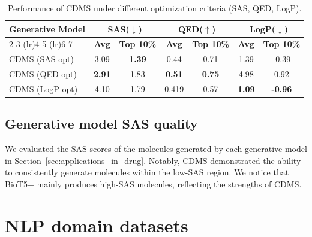 \documentclass[10pt]{article} %
\begin{document}
    \begin{table}[H]
        \centering
        \small %
        \begin{tabular}{l|c|c|c|c|c|c}
            \toprule
            \multirow{3}{*}{\parbox{1.5cm}{\centering \textbf{Generative Model}}} & \multicolumn{2}{c|}{\textbf{SAS($\downarrow$)}} & \multicolumn{2}{c|}{\textbf{QED($\uparrow$)}} & \multicolumn{2}{c}{\textbf{LogP($\downarrow$)}} \\
            \cmidrule(lr){2-3} \cmidrule(lr){4-5} \cmidrule(lr){6-7}
            & \textbf{Avg} & \textbf{Top 10\%} & \textbf{Avg} & \textbf{Top 10\%} & \textbf{Avg} & \textbf{Top 10\%} \\
            \midrule
            CDMS (SAS opt) & 3.09  & \textbf{1.39} & 0.44 & 0.71 & 1.39 & -0.39 \\ 
            CDMS (QED opt) & \textbf{2.91} & 1.83 & \textbf{0.51} & \textbf{0.75} & 4.98 & 0.92 \\ 
            CDMS (LogP opt) & 4.10 & 1.79 & 0.419 & 0.57 & \textbf{1.09} & \textbf{-0.96} \\ 
            \bottomrule
        \end{tabular}
        \caption{\small Performance of CDMS under different optimization criteria (SAS, QED, LogP).}
        \label{tab:optimized-CDMS-molecule-sorting}
    \end{table}
    
    \subsection{Generative model SAS quality}
    We evaluated the SAS scores of the molecules generated by each generative model in Section~\ref{sec:applications_in_drug}. Notably, CDMS demonstrated the ability to consistently generate molecules within the low-SAS region. We notice that BioT5+ mainly produces high-SAS molecules, reflecting the strengths of CDMS.

    

    
    
        \section{NLP domain datasets}
    \label{app:nlp_datasets}
\end{document}
